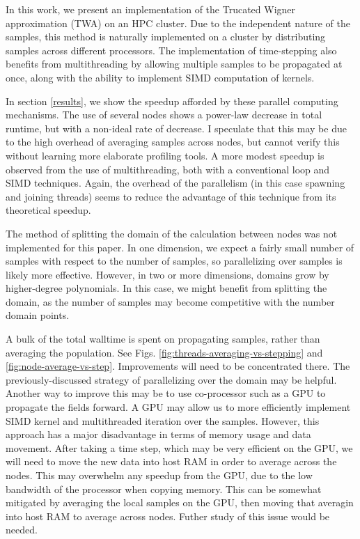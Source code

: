 \documentclass{article}
\begin{document}
In this work, we present an implementation of the Trucated Wigner approximation (TWA) on an HPC cluster.
Due to the independent nature of the samples, this method is naturally implemented on a cluster by 
distributing samples across different processors. The implementation of time-stepping also benefits from 
multithreading by allowing multiple samples to be propagated at once, along with the ability to 
implement SIMD computation of kernels.

In section \ref{results}, we show the speedup afforded by these parallel computing mechanisms. 
The use of several nodes shows a power-law decrease in total runtime, but with a non-ideal 
rate of decrease. I speculate that this may be due to the high overhead of averaging samples across nodes, 
but cannot verify this without learning more elaborate profiling tools. A more modest speedup is observed 
from the use of multithreading, both with a conventional loop and SIMD techniques. Again, the overhead of 
the parallelism (in this case spawning and joining threads) seems to reduce the advantage of this technique
from its theoretical speedup. 

The method of splitting the domain of the calculation between nodes was not implemented for this paper. 
In one dimension, we expect a fairly small number of samples with respect to the number of samples, 
so parallelizing over samples is likely more effective. However, in two or more dimensions, domains grow
by higher-degree polynomials. In this case, we might benefit from splitting the domain, as the number of 
samples may become competitive with the number domain points.

A bulk of the total walltime is spent on propagating samples, rather than averaging the population. See 
Figs. \ref{fig:threads-averaging-vs-stepping} and \ref{fig:node-average-vs-step}. Improvements will need 
to be concentrated there. The previously-discussed strategy of parallelizing over the domain may be helpful.
Another way to improve this may be to use co-processor such as a GPU to propagate the fields forward. 
A GPU may allow us to more efficiently implement SIMD kernel and multithreaded iteration over the samples.
However, this approach has a major disadvantage in terms of memory usage and data movement. 
After taking a time step, which may be very efficient on the GPU, we will need to move the new data
into host RAM in order to average across the nodes. This may overwhelm any speedup from the GPU, 
due to the low bandwidth of the processor when copying memory. This can be somewhat mitigated by 
averaging the local samples on the GPU, then moving that averagin into host RAM to average across nodes. 
Futher study of this issue would be needed.
\end{document}
